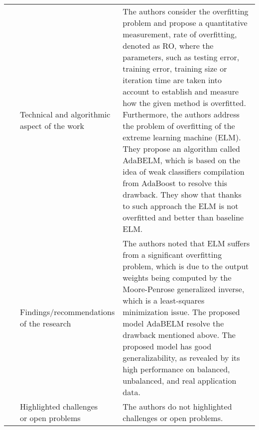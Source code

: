 \begin{landscape}
\begin{longtable}{lp{}p{}}
	\multirow{3}[0]{*}{~\citep{Feng2017}} & 
    \specialcell{Technical and algorithmic \\ aspect of the work} &
    The authors consider the overfitting problem and propose a quantitative measurement, rate of overfitting, denoted as RO, where the parameters, such as testing error, training error, training size or iteration time are taken into account to establish and measure how the given method is overfitted. Furthermore, the authors address the problem of overfitting of the extreme learning machine (ELM). They propose an algorithm called AdaBELM, which is based on the idea of weak classifiers compilation from AdaBoost to resolve this drawback. They show that thanks to such approach the ELM is not overfitted and better than baseline ELM.  
    \\ & 
    \specialcell{Findings/recommendations \\ of the research} & 
    The authors noted that ELM suffers from a significant overfitting problem, which is due to the output weights being computed by the Moore-Penrose generalized inverse, which is a least-squares minimization issue. The proposed model AdaBELM resolve the drawback mentioned above. The proposed model has good generalizability, as revealed by its high performance on balanced, unbalanced, and real application data.
    \\ & 
    \specialcell{Highlighted challenges \\ or open problems} & 
    The authors do not highlighted challenges or open problems.
	\\
	

\end{longtable}
\end{landscape}
